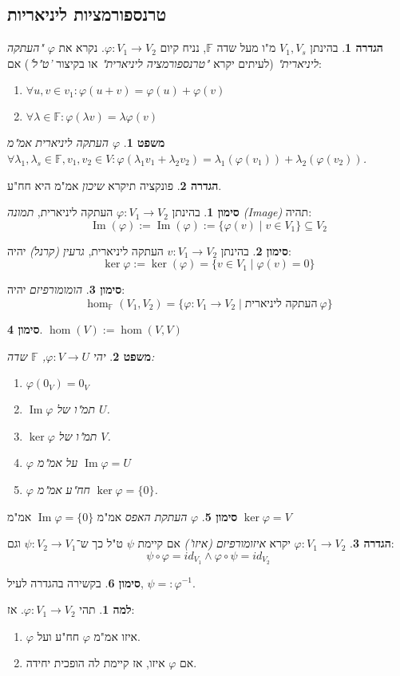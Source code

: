 \documentclass[]{article}
\DeclareMathOperator\Img   {Im}
\newcommand\F         {\mathbb{F}}
\newcommand\co        {\colon}
\renewcommand\lg      {\lambda}
\newcommand\op    {^{-1}}
\renewcommand\phi     {\varphi}
\newtheorem{Theorem}{משפט}
\theoremstyle{definition}
\newtheorem{definition}{הגדרה}
\newtheorem{Lemma}{למה}
\newtheorem{Notion}{סימון}
\newcommand\theo  [1] {\begin{Theorem}#1\end{Theorem}}
\newcommand\defi  [1] {\begin{definition}#1\end{definition}}
\newcommand\lem   [1] {\begin{Lemma}#1\end{Lemma}}
\newcommand\noti  [1] {\begin{Notion}#1\end{Notion}}
\begin{document}
\begin{multicols}{2}
		\section{טרנספורמציות ליניאריות}
		\defi{בהינתן $V_1, V_s$ מ"ו מעל שדה $\F$, נניח קיום $\phi \co V_1 \to V_2$. נקרא את $\phi$ \textit{"העתקה ליניארית"} (לעיתים יקרא \textit{"טרנספורמציה ליניארית"} או בקיצור \textit{'ט"ל'}) אם: 
		\begin{enumerate}
			\item \hfil $\forall u, v \in v_1 \co \phi(u + v) = \phi(u) + \phi(v)$
			\item \hfil $\forall \lg \in \F \co \phi(\lg v) = \lg\phi(v)$
		\end{enumerate}}
		\theo{$\phi$ העתקה ליניארית אמ"מ $\forall \lg_1, \lg_s \in \F, v_1, v_2 \in V \co \phi(\lg_1v_1 + \lg_2v_2) = \lg_1(\phi (v_1)) + \lg_2(\phi(v_2))$. }
		\defi{פונקציה תיקרא \textit{שיכון} אמ"מ היא חח"ע. }
		\noti{בהינתן $\phi \co V_1 \to V_2$ העתקה ליניארית, \textit{תמונה (Image)} תהיה: 
			\[\Img(\phi) := \Img(\phi) := \{\phi(v) \mid v \in V_1\} \subseteq V_2\]}
		\noti{בהינתן $v \co V_1 \to V_2$ העתקה ליניארית, \textit{גרעין (קרנל)} יהיה: 
		\[ \ker\phi := \ker(\phi) = \{v \in V_1 \mid \phi(v) = 0\} \]}
		\noti{\textit{הומומורפיזם} יהיה: 
		\[ \hom_\F(V_1, V_2) = \{\phi \co V_1 \to V_2 \mid \text{העתקה ליניארית}\ \phi \} \]}
		\noti{\hfil $\hom(V) := \hom(V, V)$}
		\theo{יהי $\phi \co V \to U$, $\F$ שדה: 
		\begin{enumerate}
			\item \hfil $\phi(0_V) = 0_V$
			\item $\Img\phi$ תמ"ו של $U$. 
			\item $\ker\phi$ תמ"ו של $V$. 
			\item $\phi$ על אמ"מ $\Img\phi = U$
			\item $\phi$ חח"ע אמ"מ $\ker\phi = \{0\}$. 
		\end{enumerate}}
		\noti{$\phi$ \textit{העתקת האפס} אמ"מ $\Img\phi = \{0\}$ אמ"מ $\ker\phi = V$}
		\defi{$\phi \co V_1 \to V_2$ יקרא \textit{איזומורפיזם (איזו')} אם קיימת $\psi$ ט"ל כך ש־$\psi \co V_2 \to V_1$ וגם: 
		\[ \psi \circ \phi  = id_{V_1} \land \phi \circ \psi = id_{V_2} \]}
		\noti{בקשירה בהגדרה לעיל, $\psi =: \phi\op$. }
		\lem{תהי $\phi \co V_1 \to V_2$. אז: 
		\begin{enumerate}
			\item $\phi$ איזו אמ"מ $\phi$ חח"ע ועל. 
			\item אם $\phi$ איזו, אז קיימת לה הופכית יחידה. 
		\end{enumerate}}

\end{multicols}
\end{document}
